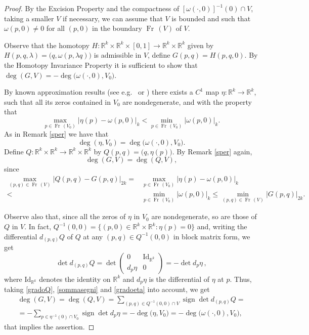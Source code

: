 \documentclass[a4paper]{amsart}
\numberwithin{equation}{section}
\DeclareMathOperator{\Fr}{\mathrm{Fr}\,}
\newcommand{\R}{\mathbb{R}}
\newcommand{\sign}{\mathop\mathrm{sign}\nolimits}
\begin{document}
\begin{proof}
By the Excision Property and the compactness of $[\omega(\cdot,0)]^{-1}(0)\cap V$, taking a 
smaller $V$ if necessary, we can assume that $V$ is bounded and such that $\omega(p,0)\neq 0$ 
for all $(p,0)$ in the boundary $\Fr(V)$ of $V$. 

Observe that the homotopy $H:\R^k\times\R^k\times[0,1]\to\R^k\times\R^k$ given by 
$H(p,q,\lambda)=\big(q,\omega(p,\lambda q)\big)$ is admissible in $V$, define 
$G(p,q)= H(p,q,0)$. By the Homotopy Invariance Property it is sufficient to show that 
$\deg(G,V)=-\deg\big(\omega(\cdot,0),V_0\big)$.

By known approximation results (see e.g.\ \cite{GP} or \cite{H}) there exists a $C^1$  
map $\eta:\R^k\to\R^k$, such that all its zeros contained in $V_0$ are nondegenerate, and 
with the property that
\[
 \max_{p\in\Fr(V_0)}|\eta(p)-\omega(p,0)|_k<\min_{p\in\Fr(V_0)}|\omega(p,0)|_k.
\]
As in Remark \ref{sper} we have that 
\begin{equation}\label{gradoeta}
 \deg(\eta,V_0)=\deg\big(\omega(\cdot,0),V_0\big).
\end{equation}
Define $Q:\R^k\times\R^k\to\R^k\times\R^k$ by $Q(p,q)=\big(q,\eta(p)\big)$. By Remark 
\ref{sper} again, 
\begin{equation}\label{gradoQ}
 \deg(G,V)=\deg(Q,V),
\end{equation}
since
\begin{align*}
\max_{(p,q)\in\Fr(V)}|Q(p,q)-G(p,q)|_{2k}=&\max_{p\in\Fr(V_0)}|\eta(p)-\omega(p,0)|_k\\
 <&\min_{p\in\Fr(V_0)}|\omega(p,0)|_k\leq\min_{(p,q)\in\Fr(V)}|G(p,q)|_{2k}.
\end{align*}

Observe also that, since all the zeros of $\eta$ in $V_0$ are nondegenerate, so are those 
of $Q$ in $V$. In fact, $Q^{-1}(0,0)=\{(p,0)\in\R^k\times\R^k:\eta(p)=0\}$ and, writing the 
differential $d_{(p,q)}Q$ of $Q$ at any $(p,q)\in Q^{-1}(0,0)$ in block matrix form, we get 
\[
 \det d_{(p,q)}Q=\det\begin{pmatrix}
0 & \mathrm{Id}_{\R^k} \\
d_p\eta & 0
\end{pmatrix}=-\det d_p\eta\,,
\]
where $\mathrm{Id}_{\R^k}$ denotes the identity on $\R^k$ and $d_p\eta$ is the differential 
of $\eta$ at $p$. Thus, taking \eqref{gradoQ}, \eqref{sommasegni} and \eqref{gradoeta} into 
account, we get
\begin{multline*}
\deg(G,V)=\deg(Q,V)=
\sum_{(p,q)\in Q^{-1}(0,0)\cap V}\sign\det d_{(p,q)}Q=\\
=-\sum_{p\in\eta^{-1}(0)\cap V_0}\sign\det d_p\eta=-\deg\big(\eta,V_0\big)=
-\deg\big(\omega(\cdot,0),V_0\big),
\end{multline*}
that implies the assertion.
\end{proof}
\end{document}
